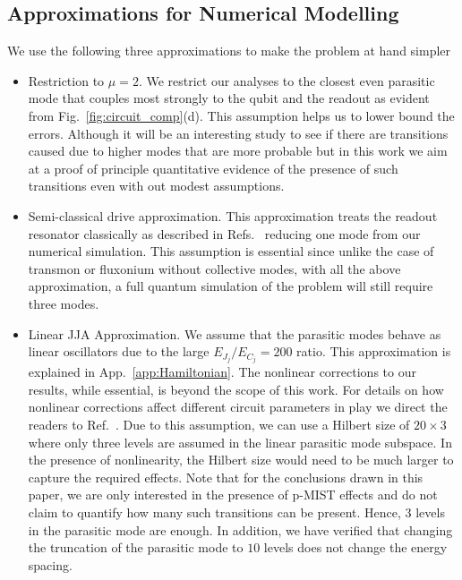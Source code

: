 \documentclass[%
reprint,
superscriptaddress,
 amsmath,amssymb,
 aps,
 prx,
longbibliography,
floatfix,
]{revtex4-2}
\begin{document}
\subsection{Approximations for Numerical Modelling}
We use the following three approximations to make the problem at hand simpler
\begin{itemize}
    \item Restriction to $\mu=2$. We restrict our analyses to the closest even parasitic mode that couples most strongly to the qubit and the readout as evident from Fig.~\ref{fig:circuit_comp}(d). This assumption helps us to lower bound the errors. Although it will be an interesting study to see if there are transitions caused due to higher modes that are more probable but in this work we aim at a proof of principle quantitative evidence of the presence of such transitions even with out modest assumptions.

    \item Semi-classical drive approximation. This approximation treats the readout resonator classically as described in Refs.~\cite{xiao2023diagrammatic,dumas2024unified,cohen2023reminiscence,khezri2023measurement} reducing one mode from our numerical simulation. This assumption is essential since unlike the case of transmon or fluxonium without collective modes, with all the above approximation, a full quantum simulation of the problem will still require three modes.

    \item Linear JJA Approximation. We assume that the parasitic modes behave as linear oscillators due to the large $E_{J_j}/E_{C_j}=200$ ratio. This approximation is explained in App.~\ref{app:Hamiltonian}. The nonlinear corrections to our results, while essential, is beyond the scope of this work. For details on how nonlinear corrections affect different circuit parameters in play we direct the readers to Ref.~\cite{viola2015collective}. Due to this assumption, we can use a Hilbert size of $20\times 3$ where only three levels are assumed in the linear parasitic mode subspace. In the presence of nonlinearity, the Hilbert size would need to be much larger to capture the required effects. Note that for the conclusions drawn in this paper, we are only interested in the presence of p-MIST effects and do not claim to quantify how many such transitions can be present. Hence, $3$ levels in the parasitic mode are enough. In addition, we have verified that changing the truncation of the parasitic mode to $10$ levels does not change the energy spacing.
\end{itemize}
\end{document}
